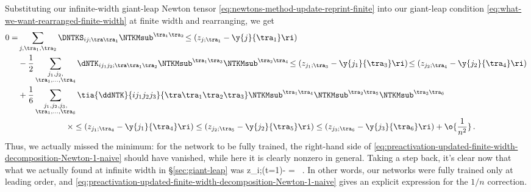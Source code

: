 Substituting our
infinite-width giant-leap Newton tensor \eqref{eq:newtons-method-update-reprint-finite}
into our giant-leap condition \eqref{eq:what-we-want-rearranged-finite-width} at finite width and rearranging, we get
\begin{align}\label{eq:preactivation-updated-finite-width-decomposition-Newton-1-naive}
0=&\sum_{j,\tra_1,\tra_2}\DNTKS_{ij;\tra\tra_1} \NTKMsub^{\tra_1\tra_2}\!\le(z_{j;\tra_1}-\y{j}{\tra_1}\ri)\, \\
&-\frac{1}{2}\sum_{\substack{j_1,j_2,\\ \tra_1,\ldots, \tra_4}}\dNTK_{i j_1j_2;\tra\tra_1\tra_2} \NTKMsub^{\tra_1\tra_3}\NTKMsub^{\tra_2\tra_4}\!\le(z_{j_1;\tra_3}-\y{j_1}{\tra_3}\ri)\!\le(z_{j_2;\tra_4}-\y{j_2}{\tra_4}\ri) \, \notag \\
&+\frac{1}{6}\sum_{\substack{j_1,j_2,j_3, \\ \tra_1,\ldots, \tra_6} }\tia{\ddNTK}{i j_1j_2j_3}{\tra\tra_1\tra_2\tra_3}  
\NTKMsub^{\tra_1\tra_4}\NTKMsub^{\tra_2\tra_5}\NTKMsub^{\tra_3\tra_6}  \notag \\
&\qquad\qquad\qquad\times \le(z_{j_1;\tra_4}-\y{j_1}{\tra_4}\ri)\le(z_{j_2;\tra_5}-\y{j_2}{\tra_5}\ri)\le(z_{j_3;\tra_6}-\y{j_3}{\tra_6}\ri)
+\o{\frac{1}{n^2}}\, . \notag
\end{align}
Thus, we actually missed the minimum: for the network to be fully trained, the right-hand side of \eqref{eq:preactivation-updated-finite-width-decomposition-Newton-1-naive} should have vanished, while here it is clearly nonzero in general.
Taking a step back, it's clear now that what we actually found at infinite width in \S\ref{sec:giant-leap} was
\be
z_{i;\tra}(t=1)- = \oninv \, .
\ee
In other words, our networks were fully trained only at leading order, and \eqref{eq:preactivation-updated-finite-width-decomposition-Newton-1-naive} gives an explicit expression for the $1/n$ correction.

